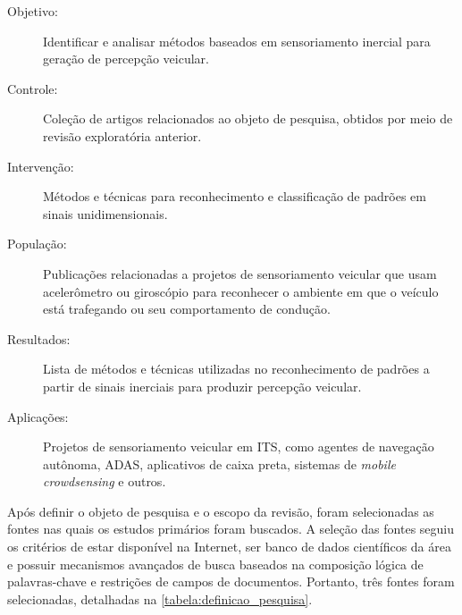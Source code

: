 \begin{description}
\item[Objetivo:] Identificar e analisar métodos baseados em sensoriamento inercial para geração de percepção veicular.
\item[Controle:] Coleção de artigos relacionados ao objeto de pesquisa, obtidos por meio de revisão exploratória anterior.
\item[Intervenção:] Métodos e técnicas para reconhecimento e classificação de padrões em sinais unidimensionais.
\item[População:]Publicações relacionadas a projetos de sensoriamento veicular que usam acelerômetro ou giroscópio para reconhecer o ambiente em que o veículo está trafegando ou seu comportamento de condução.
\item[Resultados:] Lista de métodos e técnicas utilizadas no reconhecimento de padrões a partir de sinais inerciais para produzir percepção veicular.
\item[Aplicações:] Projetos de sensoriamento veicular em ITS, como agentes de navegação autônoma, ADAS, aplicativos de caixa preta, sistemas de \textit{mobile crowdsensing} e outros.
\end{description}

Após definir o objeto de pesquisa e o escopo da revisão, foram selecionadas as fontes nas quais os estudos primários foram buscados. A seleção das fontes seguiu os critérios de estar disponível na Internet, ser banco de dados científicos da área e possuir mecanismos avançados de busca baseados na composição lógica de palavras-chave e restrições de campos de documentos. Portanto, três fontes foram selecionadas, detalhadas na \autoref{tabela:definicao_pesquisa}. 

